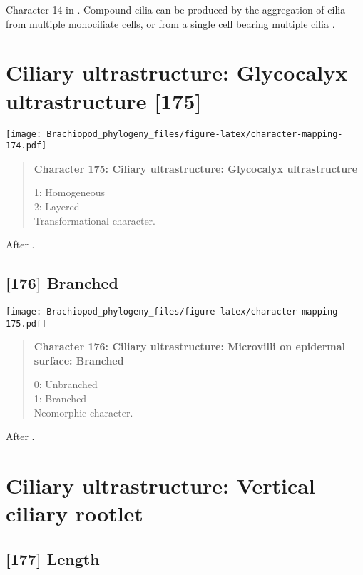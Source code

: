 \documentclass[openany]{book}
\theoremstyle{definition}
\theoremstyle{definition}
\theoremstyle{definition}
\theoremstyle{remark}
\begin{document}
Character 14 in \citet{Glenner2004}. Compound cilia can be produced by
the aggregation of cilia from multiple monociliate cells, or from a
single cell bearing multiple cilia \citep{Nielsen1987}.

\section{Ciliary ultrastructure: Glycocalyx ultrastructure
{[}175{]}}\label{ciliary-ultrastructure-glycocalyx-ultrastructure-175}

\texttt{[image: Brachiopod\_phylogeny\_files/figure-latex/character-mapping-174.pdf]}

\begin{quote}
\textbf{Character 175: Ciliary ultrastructure: Glycocalyx
ultrastructure}

1: Homogeneous\\
2: Layered\\
Transformational character.
\end{quote}

After \citet{Lundin2009}.

\subsection*{{[}176{]} Branched}\label{branched}

\texttt{[image: Brachiopod\_phylogeny\_files/figure-latex/character-mapping-175.pdf]}

\begin{quote}
\textbf{Character 176: Ciliary ultrastructure: Microvilli on epidermal
surface: Branched}

0: Unbranched\\
1: Branched\\
Neomorphic character.
\end{quote}

After \citet{Lundin2009}.

\section{Ciliary ultrastructure: Vertical ciliary
rootlet}\label{ciliary-ultrastructure-vertical-ciliary-rootlet}

\subsection*{{[}177{]} Length}\label{length}
\end{document}
